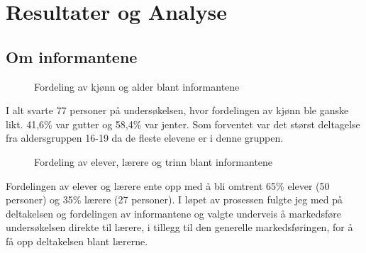 \section{Resultater og Analyse}

\subsection{Om informantene}
\begin{figure}[H]
    \centering
    \caption{Fordeling av kjønn og alder blant informantene}
\end{figure}
I alt svarte 77 personer på undersøkelsen, hvor fordelingen av kjønn ble ganske likt.
41,6\% var gutter og 58,4\% var jenter. Som forventet var det størst deltagelse fra aldersgruppen 16-19 da de fleste elevene er i denne gruppen.

\begin{figure}[H]
    \centering
    \caption{Fordeling av elever, lærere og trinn blant informantene}
\end{figure}
Fordelingen av elever og lærere ente opp med å bli omtrent 65\% elever (50 personer) og 35\% lærere (27 personer). I løpet av prosessen fulgte jeg med på deltakelsen og fordelingen av informantene og valgte underveis å markedsføre undersøkelsen direkte til lærere, i tillegg til den generelle markedsføringen, for å få opp deltakelsen blant lærerne.

